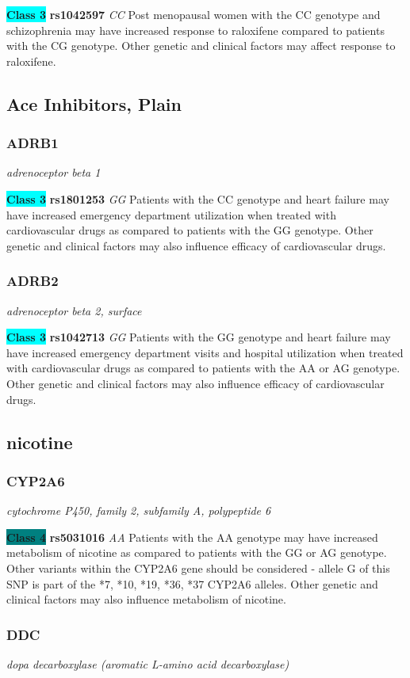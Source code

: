 \documentclass{report}
\begin{document}
\textbf{\colorbox{cyan} {Class 3}} \textbf{ rs1042597 } \textit{ CC }
Post menopausal women with the CC genotype and schizophrenia may have increased response to raloxifene compared to patients with the CG genotype. Other genetic and clinical factors may affect response to raloxifene. \newline\subsection{ Ace Inhibitors, Plain }\subsubsection{ ADRB1 }
\textit{ adrenoceptor beta 1 }

\textbf{\colorbox{cyan} {Class 3}} \textbf{ rs1801253 } \textit{ GG }
Patients with the CC genotype and heart failure may have increased emergency department utilization when treated with cardiovascular drugs as compared to patients with the GG genotype. Other genetic and clinical factors may also influence efficacy of cardiovascular drugs.\newline\subsubsection{ ADRB2 }
\textit{ adrenoceptor beta 2, surface }

\textbf{\colorbox{cyan} {Class 3}} \textbf{ rs1042713 } \textit{ GG }
Patients with the GG genotype and heart failure may have increased emergency department visits and hospital utilization when treated with cardiovascular drugs as compared to patients with the AA or AG genotype. Other genetic and clinical factors may also influence efficacy of cardiovascular drugs.\newline\subsection{ nicotine }\subsubsection{ CYP2A6 }
\textit{ cytochrome P450, family 2, subfamily A, polypeptide 6 }

\textbf{\colorbox{teal} {Class 4}} \textbf{ rs5031016 } \textit{ AA }
Patients with the AA genotype may have increased metabolism of nicotine as compared to patients with the GG or AG genotype. Other variants within the CYP2A6 gene should be considered - allele G of this SNP is part of the *7, *10, *19, *36, *37 CYP2A6 alleles. Other genetic and clinical factors may also influence metabolism of nicotine.\newline\subsubsection{ DDC }
\textit{ dopa decarboxylase (aromatic L-amino acid decarboxylase) }
\end{document}
